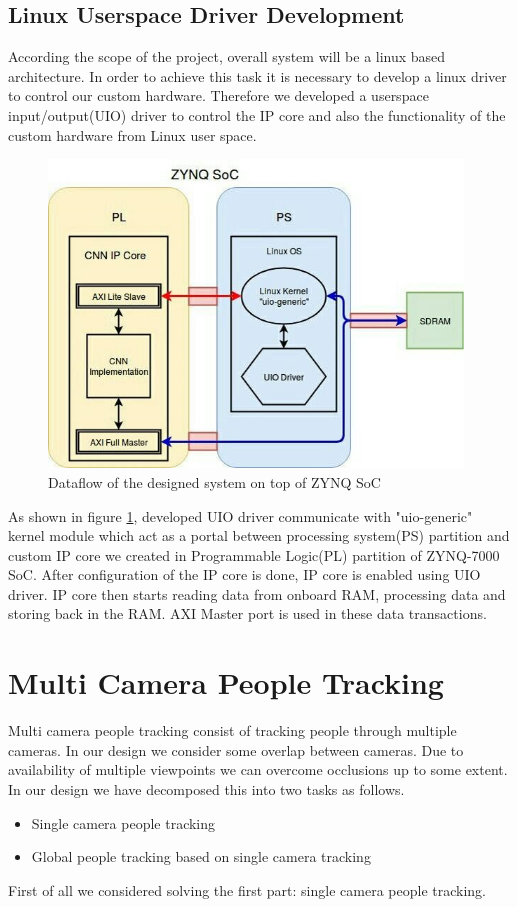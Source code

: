 \documentclass[12pt,a4paper]{report}
\begin{document}
\subsection{Linux Userspace Driver Development} 
According the scope of the project, overall system will be a linux based architecture. In order to achieve this task it is necessary to develop a linux driver to control our custom hardware. Therefore we developed a userspace input/output(UIO) driver to control the IP core and also the functionality of the custom hardware from Linux user space.
\begin{figure}[H]
\includegraphics[width=11cm]{all.jpg}
\centering
\caption{Dataflow of the designed system on top of ZYNQ SoC}
\label{all}
\end{figure}
As shown in figure \ref{all}, developed UIO driver communicate with "uio-generic" kernel module which act as a portal between processing system(PS) partition and custom IP core we created in Programmable Logic(PL) partition of ZYNQ-7000 SoC. After configuration of the IP core is done, IP core is enabled using UIO driver. IP core then starts reading data from onboard RAM, processing data and storing back in the RAM. AXI Master port is used in these data transactions.  

\section{Multi Camera People Tracking}
Multi camera people tracking consist of tracking people through multiple cameras. In our design we consider some overlap between cameras. Due to availability of multiple viewpoints we can overcome occlusions up to some extent. In our design we have decomposed this into two tasks as follows.
\begin{itemize}
\item Single camera people tracking
\item Global people tracking based on single camera tracking
\end{itemize}
First of all we considered solving the first part: single camera people tracking.
\end{document}
